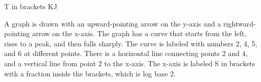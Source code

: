 T in brackets KJ

A graph is drawn with an upward-pointing arrow on the y-axis and a rightward-pointing arrow on the x-axis. The graph has a curve that starts from the left, rises to a peak, and then falls sharply. The curve is labeled with numbers 2, 4, 5, and 6 at different points. There is a horizontal line connecting points 2 and 4, and a vertical line from point 2 to the x-axis. The x-axis is labeled S in brackets with a fraction inside the brackets, which is log base 2.